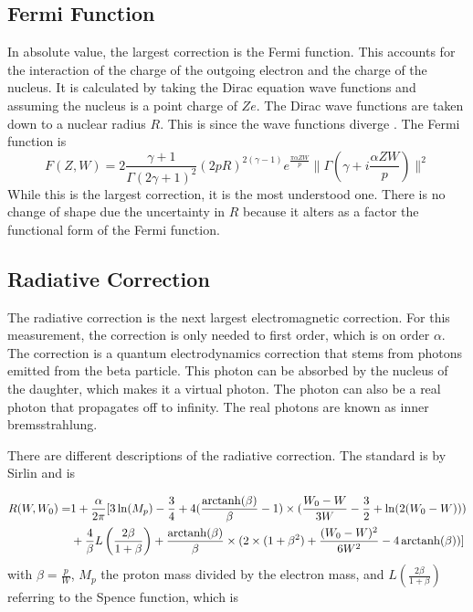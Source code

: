 \documentclass[../MaxHughesThesis.tex]{subfiles}
\begin{document}
\subsection{Fermi Function}

In absolute value, the largest correction is the Fermi function.
This accounts for the interaction of the charge of the outgoing electron and the charge of the nucleus.
It is calculated by taking the Dirac equation wave functions and assuming the nucleus is a point charge of $Ze$.
The Dirac wave functions are taken down to a nuclear radius $R$.
This is since the wave functions diverge \cite{Wil89}.
The Fermi function is %
\begin{equation}
	F(Z,W) = 2\frac{\gamma + 1}{\Gamma(2\gamma +1)^{2}}(2pR)^{2(\gamma - 1)}e^{\frac{\pi\alpha ZW}{p}}\|\Gamma(\gamma + i\frac{\alpha ZW}{p})\|^{2}
	\label{eq:fermifunc}
\end{equation}
While this is the largest correction, it is the most understood one.
There is no change of shape due the uncertainty in $R$ because it alters as a factor the functional form of the Fermi function. 

\subsection{Radiative Correction}
The radiative correction is the next largest electromagnetic correction.
For this measurement, the correction is only needed to first order, which is on order $\alpha$.
The correction is a quantum electrodynamics correction that stems from photons emitted from the beta particle.
This photon can be absorbed by the nucleus of the daughter, which makes it a virtual photon.
The photon can also be a real photon that propagates off to infinity.
The real photons are known as inner bremsstrahlung.

There are different descriptions of the radiative correction.  
The standard is by Sirlin \cite{Sir67} and is %

\begin{equation}
	\label{eq:sirlinrad}
	\begin{split}
	R(W,W_{0}) = & 1 + \frac{\alpha}{2\pi}[3\ln(M_{p}) - \frac{3}{4} + 4(\frac{\operatorname{arctanh}(\beta)}{\beta} - 1)\times(\frac{W_{0} - W}{3W} - \frac{3}{2} + \ln(2(W_{0} - W))) \\
	 & + \frac{4}{\beta}L \left(\frac{2\beta}{1 + \beta}\right) + \frac{\operatorname{arctanh}(\beta)}{\beta}\times(2\times(1 + \beta^{2}) + \frac{(W_{0} - W)^{2}}{6W^{2}} - 4 \operatorname{arctanh}(\beta))]
	\end{split}
\end{equation} 
with $\beta = \frac{p}{W}$, $M_{p}$ the proton mass divided by the electron mass, and $L(\frac{2\beta}{1+\beta})$ referring to the Spence function, which is \cite{Wil95} %
\end{document}
